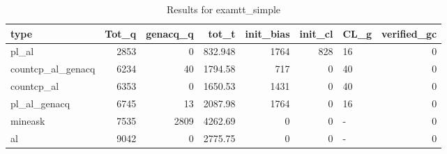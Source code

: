 \begin{table}[ht]
\caption{Results for examtt_simple}
\begin{tabular}{lrrrrrlr}
\hline
 type              &   Tot\_q &   genacq\_q &    tot\_t &   init\_bias &   init\_cl & CL\_g   &   verified\_gc \\
\hline
 pl\_al             &    2853 &          0 &  832.948 &        1764 &       828 & 16     &             0 \\
 countcp\_al\_genacq &    6234 &         40 & 1794.58  &         717 &         0 & 40     &             0 \\
 countcp\_al        &    6353 &          0 & 1650.53  &        1431 &         0 & 40     &             0 \\
 pl\_al\_genacq      &    6745 &         13 & 2087.98  &        1764 &         0 & 16     &             0 \\
 mineask           &    7535 &       2809 & 4262.69  &           0 &         0 & -      &             0 \\
 al                &    9042 &          0 & 2775.75  &           0 &         0 & -      &             0 \\
\hline
\end{tabular}
\end{table}